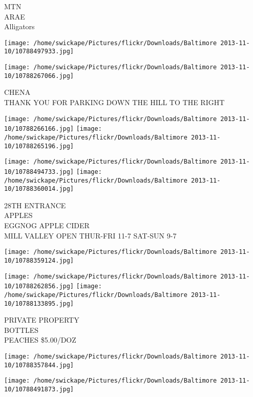 \documentclass[10pt,letterpaper]{article}
\begin{document}
MTN\\
ARAE\\
Alligators\\
\pagebreak

\texttt{[image: /home/swickape/Pictures/flickr/Downloads/Baltimore 2013-11-10/10788497933.jpg]}

\vspace{0.25in}
\texttt{[image: /home/swickape/Pictures/flickr/Downloads/Baltimore 2013-11-10/10788267066.jpg]}

CHENA\\
THANK YOU FOR PARKING DOWN THE HILL TO THE RIGHT\\
\pagebreak

\texttt{[image: /home/swickape/Pictures/flickr/Downloads/Baltimore 2013-11-10/10788266166.jpg]}
\texttt{[image: /home/swickape/Pictures/flickr/Downloads/Baltimore 2013-11-10/10788265196.jpg]}

\texttt{[image: /home/swickape/Pictures/flickr/Downloads/Baltimore 2013-11-10/10788494733.jpg]}
\texttt{[image: /home/swickape/Pictures/flickr/Downloads/Baltimore 2013-11-10/10788360014.jpg]}

28TH ENTRANCE\\
APPLES\\
EGGNOG APPLE CIDER\\
MILL VALLEY OPEN THUR{-}FRI 11{-}7 SAT{-}SUN 9{-}7\\
\pagebreak

\texttt{[image: /home/swickape/Pictures/flickr/Downloads/Baltimore 2013-11-10/10788359124.jpg]}

\vspace{0.25in}
\texttt{[image: /home/swickape/Pictures/flickr/Downloads/Baltimore 2013-11-10/10788262856.jpg]}
\texttt{[image: /home/swickape/Pictures/flickr/Downloads/Baltimore 2013-11-10/10788133895.jpg]}

PRIVATE PROPERTY\\
BOTTLES\\
PEACHES \$5.00/DOZ\\
\pagebreak

\texttt{[image: /home/swickape/Pictures/flickr/Downloads/Baltimore 2013-11-10/10788357844.jpg]}

\vspace{0.25in}
\texttt{[image: /home/swickape/Pictures/flickr/Downloads/Baltimore 2013-11-10/10788491873.jpg]}
\end{document}
